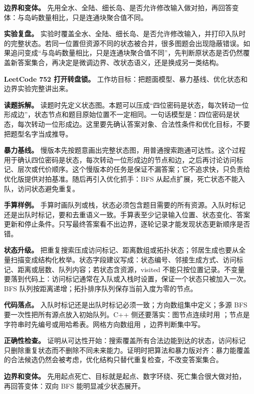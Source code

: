 \textbf{边界和变体。} 先用全水、全陆、细长岛、是否允许修改输入做对拍，再回答变体：与岛屿数量相比，只是连通块聚合值不同。

\textbf{实验复盘。} 实验时覆盖全水、全陆、细长岛、是否允许修改输入，并打印入队时的完整状态。若同一位置但资源不同的状态被合并，很多图题会出现隐蔽错误。如果追问变成“与岛屿数量相比，只是连通块聚合值不同”，先判断原状态是否仍然覆盖新答案集合，再决定是微调边界、改状态语义，还是换成另一类结构。

\noindent\textbf{LeetCode 752 打开转盘锁。} 工作坊目标：把题面模型、暴力基线、优化状态和边界实验完整讲出来。

\textbf{读题拆解。} 读题时先定义状态图。本题可以压成“四位密码是状态，每次转动一位形成边”，状态节点和题目原始位置不一定相同。一句话模型是：四位密码是状态，每次转动一位形成边。这里要先确认答案对象、合法性条件和优化目标，不要把题型名字当成推导。

\textbf{暴力基线。} 慢版本先按题意画出完整状态图，用普通搜索跑通可达性。这个过程用于确认四位密码是状态，每次转动一位形成边的节点和边，之后再讨论访问标记、层次或代价顺序。这个慢版本的任务是保证不漏答案；它不追求快，只负责给优化版提供对拍基准。随后再引入优化抓手：BFS 从起点扩展，死亡状态不能入队，访问状态避免重复。

\textbf{手算样例。} 手算时画队列或栈，状态必须包含题目需要的所有资源。入队时标记还是出队时标记，要和去重语义一致。手算表至少记录输入位置、状态变化、答案更新和停止条件。只写最终答案看不出边界，逐轮记录才能发现状态更新顺序是否错。

\textbf{状态升级。} 把重复搜索压成访问标记、距离数组或拓扑状态；邻居生成也要从全量扫描变成结构化枚举。状态字段建议写成：状态编号、邻接生成方式、访问标记、距离或层数、队列内容；若状态含资源，visited 不能只按位置记录。不变量要落到代码上：访问标记通常在入队或入栈时设置，保证一个状态只被加入一次。BFS 队列按距离递增；拓扑排序队列保存当前入度为零的节点。

\textbf{代码落点。} 入队时标记还是出队时标记必须一致；方向数组集中定义；多源 BFS 要一次性把所有源点放入初始队列。C++ 侧还要落实：图节点连续时用 ；节点是字符串时先编号或用哈希表。网格方向数组用 ，边界判断集中写。

\textbf{正确性检查。} 证明从可达性开始：搜索覆盖所有合法边能到达的状态，访问标记只删除重复状态而不删除不同未来能力。证明时把算法和暴力版对齐：暴力能覆盖的合法候选仍然会被考虑，优化结构只替代重复检查，不改变答案集合。

\textbf{边界和变体。} 先用起点死亡、目标就是起点、数字环绕、死亡集合很大做对拍，再回答变体：双向 BFS 能明显减少状态展开。

